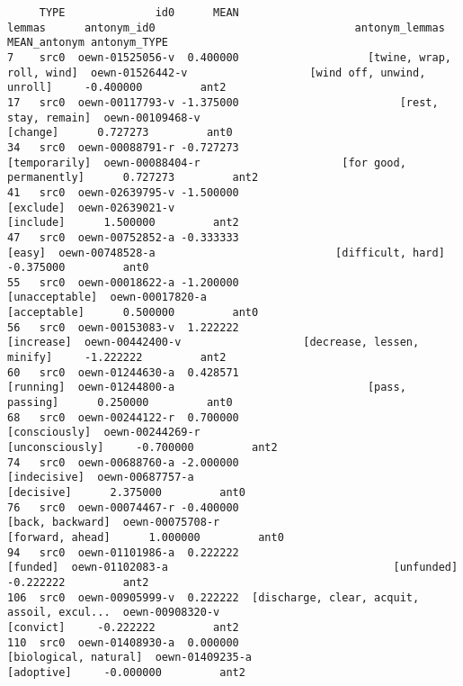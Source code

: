 \documentclass[a4paper,10pt,onecolumn,oneside,openright]{article}
\begin{document}
\begin{verbatim}
     TYPE              id0      MEAN                                       lemmas      antonym_id0                               antonym_lemmas  MEAN_antonym antonym_TYPE
7    src0  oewn-01525056-v  0.400000                    [twine, wrap, roll, wind]  oewn-01526442-v                   [wind off, unwind, unroll]     -0.400000         ant2
17   src0  oewn-00117793-v -1.375000                         [rest, stay, remain]  oewn-00109468-v                                     [change]      0.727273         ant0
34   src0  oewn-00088791-r -0.727273                                [temporarily]  oewn-00088404-r                      [for good, permanently]      0.727273         ant2
41   src0  oewn-02639795-v -1.500000                                    [exclude]  oewn-02639021-v                                    [include]      1.500000         ant2
47   src0  oewn-00752852-a -0.333333                                       [easy]  oewn-00748528-a                            [difficult, hard]     -0.375000         ant0
55   src0  oewn-00018622-a -1.200000                               [unacceptable]  oewn-00017820-a                                 [acceptable]      0.500000         ant0
56   src0  oewn-00153083-v  1.222222                                   [increase]  oewn-00442400-v                   [decrease, lessen, minify]     -1.222222         ant2
60   src0  oewn-01244630-a  0.428571                                    [running]  oewn-01244800-a                              [pass, passing]      0.250000         ant0
68   src0  oewn-00244122-r  0.700000                                [consciously]  oewn-00244269-r                              [unconsciously]     -0.700000         ant2
74   src0  oewn-00688760-a -2.000000                                 [indecisive]  oewn-00687757-a                                   [decisive]      2.375000         ant0
76   src0  oewn-00074467-r -0.400000                             [back, backward]  oewn-00075708-r                             [forward, ahead]      1.000000         ant0
94   src0  oewn-01101986-a  0.222222                                     [funded]  oewn-01102083-a                                   [unfunded]     -0.222222         ant2
106  src0  oewn-00905999-v  0.222222  [discharge, clear, acquit, assoil, excul...  oewn-00908320-v                                    [convict]     -0.222222         ant2
110  src0  oewn-01408930-a  0.000000                        [biological, natural]  oewn-01409235-a                                   [adoptive]     -0.000000         ant2

\end{verbatim}
\end{document}
